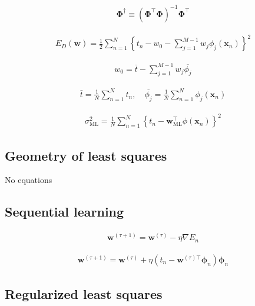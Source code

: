 \documentclass{article}
\begin{document}
\begin{align*}
\boldsymbol{\Phi}^{\dagger} \equiv \left( \boldsymbol{\Phi}^{\top} \boldsymbol{\Phi} \right)^{-1} \boldsymbol{\Phi}^{\top}
\tag{4.16}
\end{align*}

\begin{align*}
E_D(\mathbf{w}) = \frac{1}{2} \sum_{n=1}^{N} \left\{ t_n - w_0 - \sum_{j=1}^{M-1} w_j \phi_j(\mathbf{x}_n) \right\}^2
\tag{4.17}
\end{align*}

\begin{align*}
w_0 = \bar{t} - \sum_{j=1}^{M-1} w_j \overline{\phi_j}
\tag{4.18}
\end{align*}

\begin{align*}
\bar{t} = \frac{1}{N} \sum_{n=1}^{N} t_n, \quad \overline{\phi_j} = \frac{1}{N} \sum_{n=1}^{N} \phi_j(\mathbf{x}_n)
\tag{4.19}
\end{align*}

\begin{align*}
\sigma_{\mathrm{ML}}^2 = \frac{1}{N} \sum_{n=1}^{N} \left\{ t_n - \mathbf{w}_{\mathrm{ML}}^{\top} \phi(\mathbf{x}_n) \right\}^2
\tag{4.20}
\end{align*}

\subsection{Geometry of least squares}

No equations

\subsection{Sequential learning}

\begin{align*}
\mathbf{w}^{(\tau+1)} = \mathbf{w}^{(\tau)} - \eta \nabla E_n
\tag{4.21}
\end{align*}

\begin{align*}
\mathbf{w}^{(\tau+1)} = \mathbf{w}^{(\tau)} + \eta \left( t_n - \mathbf{w}^{(\tau) \top} \boldsymbol{\phi}_n \right) \boldsymbol{\phi}_n
\tag{4.22}
\end{align*}

\subsection{Regularized least squares}
\end{document}
